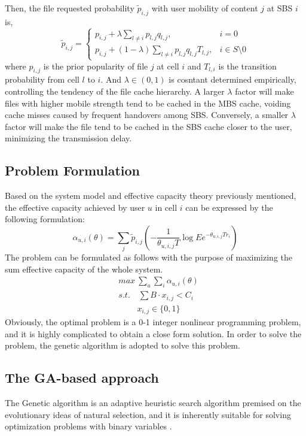 \documentclass[conference]{IEEEtran}
\begin{document}
Then, the file requested probability ${\tilde{p}_{i,j}}$ with user mobility of content $j$ at SBS $i$ is,
\begin{equation}
{\tilde{p}_{i,j}}=
\begin{cases}
p_{i,j}+\lambda\sum_{l\neq i}p_{l,j}q_{l,j},  & i=0\\
p_{i,j}+(1-\lambda)\sum_{l\neq i}p_{l,j}q_{l,j}T_{l,j}, & i\in S\setminus 0
\end{cases}
\end{equation}
where $p_{i,j}$ is the prior popularity of file $j$ at cell $i$ and $T_{l,i}$ is the transition probability from cell $l$ to $i$. And $\lambda\in(0,1)$ is cosntant determined empirically, controlling the tendency of the file cache hierarchy. A larger $\lambda$ factor will make files with higher mobile strength tend to be cached in the MBS cache, voiding cache misses caused by frequent handovers among SBS. Conversely, a smaller $\lambda$ factor will make the file tend to be cached in the SBS cache closer to the user, minimizing the transmission delay.

\subsection{Problem Formulation}
Based on the system model and effective capacity theory previously mentioned, the effective capacity achieved by user $u$ in cell $i$ can be expressed by the following formulation:
\begin{equation}
\alpha_{u,i}(\theta)=\sum_j{\tilde{p}_{i,j}}(-\frac{1}{\theta_{u,i,j}T}\log Ee^{-\theta_{u,i,j}Tr_i})
\end{equation}
The problem can be formulated as follows with the purpose of maximizing the sum effective capacity of the whole system.
\begin{equation}
 \begin{aligned}
   & {max}\ \sum_u\sum_i\alpha_{u,i}(\theta)\\
   & s.t. \quad\sum B\cdot x_{i,j}<C_i\\
   & \qquad \ x_{i,j}\in\{0,1\}
 \end{aligned}
\end{equation}
Obviously, the optimal problem is a 0-1 integer nonlinear programming problem, and it is highly complicated to obtain a close form solution. In order to solve the problem, the genetic algorithm is adopted to solve this problem.

\subsection{The GA-based approach}
The Genetic algorithm is an adaptive heuristic search algorithm premised on the evolutionary ideas of natural selection, and it is inherently suitable for solving optimization problems with binary variables \cite{Srinivas2002Genetic}.
\end{document}
